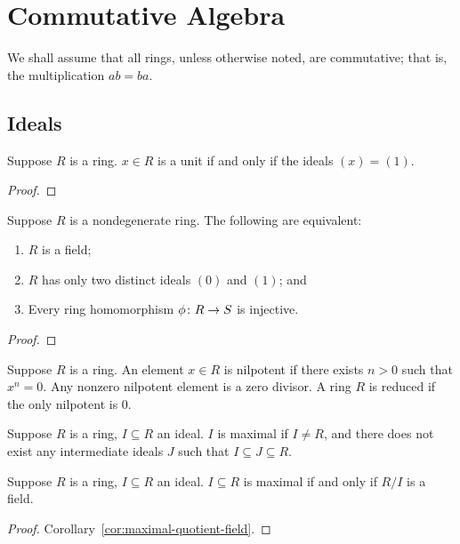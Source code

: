 \chapter{Commutative Algebra}

\begin{remark}
    We shall assume that all rings,
    unless otherwise noted, are commutative;
    that is, the multiplication \(ab = ba\).
\end{remark}

\section{Ideals}

\begin{proposition}
    Suppose \(R\) is a ring.
    \(x \in R\) is a unit if and only if the ideals \((x) = (1)\).
\end{proposition}
\begin{proof}
    
\end{proof}

\begin{theorem}
    Suppose \(R\) is a nondegenerate ring.
    The following are equivalent:
    \begin{enumerate}[label={(\alph*)}, itemsep=0mm]
        \item \(R\) is a field;
        \item \(R\) has only two distinct ideals \((0)\) and \((1)\); and
        \item Every ring homomorphism \(\phi\colon R\to S\) is injective.
    \end{enumerate}
\end{theorem}
\begin{proof}
    
\end{proof}

\begin{definition}
    Suppose \(R\) is a ring.
    An element \(x \in R\) is nilpotent if there exists \(n > 0\) such that \(x^n = 0\).
    Any nonzero nilpotent element is a zero divisor.
    A ring \(R\) is reduced if the only nilpotent is 0.
\end{definition}

\begin{definition}
    Suppose \(R\) is a ring, \(I \subseteq R\) an ideal.
    \(I\) is maximal if \(I \neq R\),
    and there does not exist any intermediate ideals \(J\)
    such that \(I \subseteq J \subseteq R\).
\end{definition}
\begin{theorem}\label{thm:maximal-quotient-field}
    Suppose \(R\) is a ring, \(I \subseteq R\) an ideal.
    \(I \subseteq R\) is maximal if and only if \(R/I\) is a field.
\end{theorem}
\begin{proof}
    Corollary~\ref{cor:maximal-quotient-field}.
\end{proof}

